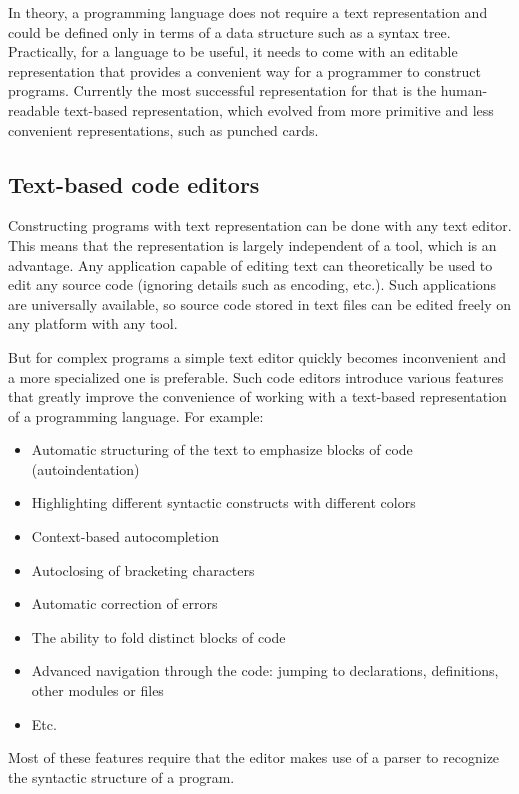 In theory, a programming language does not require a text representation and
could be defined only in terms of a data structure such as a syntax
tree. Practically, for a language to be useful, it needs to come with an
editable representation that provides a convenient way for a programmer to
construct programs. Currently the most successful representation for that is the
human-readable text-based representation, which evolved from more primitive and
less convenient representations, such as punched cards\cite{columbia_history_cards, punched_cards_wikipedia}.

\subsection{Text-based code editors}\label{sub:text_editors}
Constructing programs with text representation can be done with any text editor. This means that the representation is largely independent of a tool, which is an advantage. Any application capable of editing text can theoretically be used to edit any source code (ignoring details such as encoding, etc.). Such applications are universally available, so source code stored in text files can be edited freely on any platform with any tool.

But for complex programs a simple text editor quickly becomes inconvenient and a
more specialized one is preferable. Such code editors introduce various features
that greatly improve the convenience of working with a text-based representation
of a programming language. For example:
\begin{itemize}
	\item Automatic structuring of the text to emphasize blocks of code
          (autoindentation)
	\item Highlighting different syntactic constructs with different colors
	\item Context-based autocompletion
	\item Autoclosing of bracketing characters
	\item Automatic correction of errors
	\item The ability to fold distinct blocks of code
	\item Advanced navigation through the code: jumping to declarations,
          definitions, other modules or files
	\item Etc.
\end{itemize}

Most of these features require that the editor makes use of a parser to
recognize the syntactic structure of a program.

